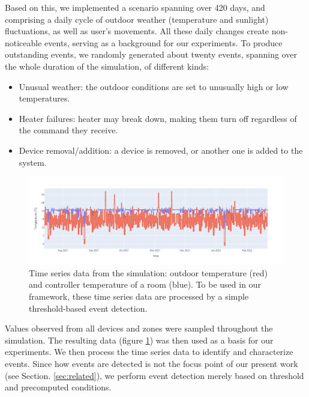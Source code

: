 \documentclass[entropy,article,submit,moreauthors,pdftex]{Definitions/mdpi}
\begin{document}
Based on this, we implemented a scenario spanning over 420 days, and
comprising a daily cycle of outdoor weather (temperature and sunlight) fluctuations, as well
as user's movements. All these daily changes create non-noticeable events,
serving as a background for our experiments. To produce outstanding
events, we randomly generated about twenty events, spanning over the whole
duration of the simulation, of different kinds:

\begin{itemize}
    \item Unusual weather: the outdoor conditions are set to unusually high or
          low temperatures.
    \item Heater failures: heater may break down, making them turn off regardless
          of the command they receive.
    \item Device removal/addition: a device is removed, or another one is added
          to the system.
\end{itemize}


\begin{figure}[ht]
    \includegraphics[width=\linewidth]{figures/ts_example}
    \caption{Time series data from the simulation: outdoor temperature (red) and
        controller temperature of a room (blue). To be used in our framework, these time series data are
        processed by a simple threshold-based event detection.}
    \label{fig:ts_example}
\end{figure}

Values observed from all devices and zones were sampled throughout
the simulation. The resulting data (figure
\ref{fig:ts_example}) was then used as a basis for our experiments.
We then process the time series data to identify and characterize events.
Since how events are detected is not the focus point of our present work (see Section.
\ref{sec:related}), we perform event detection merely based on threshold and precomputed conditions.
\end{document}
